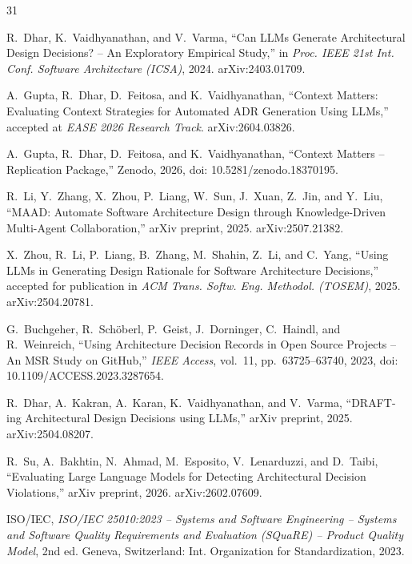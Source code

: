 \documentclass[lettersize,journal]{IEEEtran}
\begin{document}
\begin{thebibliography}{31}
\footnotesize

R.~Dhar, K.~Vaidhyanathan, and V.~Varma, ``Can LLMs Generate Architectural Design Decisions? -- An Exploratory Empirical Study,'' in \textit{Proc. IEEE 21st Int. Conf. Software Architecture (ICSA)}, 2024. arXiv:2403.01709.

A.~Gupta, R.~Dhar, D.~Feitosa, and K.~Vaidhyanathan, ``Context Matters: Evaluating Context Strategies for Automated ADR Generation Using LLMs,'' accepted at \textit{EASE 2026 Research Track}. arXiv:2604.03826.

A.~Gupta, R.~Dhar, D.~Feitosa, and K.~Vaidhyanathan, ``Context Matters -- Replication Package,'' Zenodo, 2026, doi: 10.5281/zenodo.18370195.

R.~Li, Y.~Zhang, X.~Zhou, P.~Liang, W.~Sun, J.~Xuan, Z.~Jin, and Y.~Liu, ``MAAD: Automate Software Architecture Design through Knowledge-Driven Multi-Agent Collaboration,'' arXiv preprint, 2025. arXiv:2507.21382.

X.~Zhou, R.~Li, P.~Liang, B.~Zhang, M.~Shahin, Z.~Li, and C.~Yang, ``Using LLMs in Generating Design Rationale for Software Architecture Decisions,'' accepted for publication in \textit{ACM Trans. Softw. Eng. Methodol. (TOSEM)}, 2025. arXiv:2504.20781.

G.~Buchgeher, R.~Schöberl, P.~Geist, J.~Dorninger, C.~Haindl, and R.~Weinreich, ``Using Architecture Decision Records in Open Source Projects -- An MSR Study on GitHub,'' \textit{IEEE Access}, vol.~11, pp.~63725--63740, 2023, doi: 10.1109/ACCESS.2023.3287654.

R.~Dhar, A.~Kakran, A.~Karan, K.~Vaidhyanathan, and V.~Varma, ``DRAFT-ing Architectural Design Decisions using LLMs,'' arXiv preprint, 2025. arXiv:2504.08207.

R.~Su, A.~Bakhtin, N.~Ahmad, M.~Esposito, V.~Lenarduzzi, and D.~Taibi, ``Evaluating Large Language Models for Detecting Architectural Decision Violations,'' arXiv preprint, 2026. arXiv:2602.07609.

ISO/IEC, \textit{ISO/IEC 25010:2023 -- Systems and Software Engineering -- Systems and Software Quality Requirements and Evaluation (SQuaRE) -- Product Quality Model}, 2nd ed. Geneva, Switzerland: Int. Organization for Standardization, 2023.


\end{thebibliography}
\end{document}
